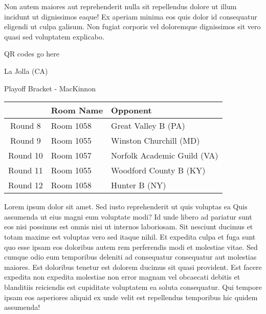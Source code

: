 \documentclass{article}%
\begin{document}
\newline%
Non autem maiores aut reprehenderit nulla sit repellendus dolore ut illum incidunt ut dignissimos eaque! Ex aperiam minima eos quis dolor id consequatur eligendi ut culpa galisum. Non fugiat corporis vel doloremque dignissimos sit vero quasi sed voluptatem explicabo.\newline%
\newline%
%
\vspace*{30pt}%
\begin{center}%
\begin{Huge}%
QR codes go here%
\end{Huge}%
\end{center}%
\newpage%
\begin{center}%
\begin{Huge}%
La Jolla (CA)%
\end{Huge}%
\vspace*{8pt}%
\linebreak%
\begin{Large}%
Playoff Bracket {-} MacKinnon%
\end{Large}%
\end{center}%
\begin{tabularx}{\textwidth}{|c|Y|Y|}%
\hline%
&Room Name&Opponent\\%
\hline%
Round 8&Room 1058&Great Valley B (PA)\\%
Round 9&Room 1055&Winston Churchill (MD)\\%
Round 10&Room 1057&Norfolk Academic Guild (VA)\\%
Round 11&Room 1055&Woodford County B (KY)\\%
Round 12&Room 1058&Hunter B (NY)\\%
\hline%
\end{tabularx}%
\vspace*{8pt}%
\linebreak%
\newline%
\newline%
Lorem ipsum dolor sit amet. Sed iusto reprehenderit ut quis voluptas ea Quis assumenda ut eius magni eum voluptate modi? Id unde libero ad pariatur sunt eos nisi possimus est omnis nisi ut internos laboriosam. Sit nesciunt ducimus et totam maxime est voluptas vero sed itaque nihil. Et expedita culpa et fuga sunt quo esse ipsam eos doloribus autem rem perferendis modi et molestiae vitae.\newline%
\newline%
Sed cumque odio eum temporibus deleniti ad consequatur consequatur aut molestias maiores. Est doloribus tenetur est dolorem ducimus sit quasi provident. Est facere expedita non expedita molestiae non error magnam vel obcaecati debitis et blanditiis reiciendis est cupiditate voluptatem ea soluta consequatur. Qui tempore ipsam eos asperiores aliquid ex unde velit est repellendus temporibus hic quidem assumenda!\newline%
\end{document}
